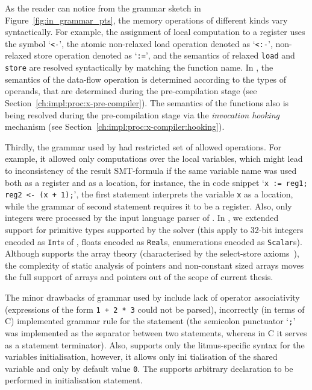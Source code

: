 As the reader can notice from the grammar sketch in Figure~\ref{fig:in_grammar_pts}, the memory operations of different kinds vary syntactically.
For example, the assignment of local computation to a register uses the symbol `\lstinline{<-}', the atomic non-relaxed load operation denoted as `\lstinline{<:-}', non-relaxed store operation denoted as `\lstinline{:=}', and the semantics of relaxed \lstinline{load} and \lstinline{store} are resolved syntactically by matching the function name.
In \porthos[2], the semantics of the data-flow operation is determined according to the types of operands, that are determined during the pre-compilation stage (see Section~\ref{ch:impl:proc:x-pre-compiler}).
The semantics of the functions also is being resolved during the pre-compilation stage via the \textit{invocation hooking} mechanism (see Section~\ref{ch:impl:proc:x-compiler:hooking}).

Thirdly, the grammar used by \porthos{} had restricted set of allowed operations. For example, it allowed only computations over the local variables, which might lead to inconsistency of the result SMT-formula if the same variable name was used both as a register and as a location, for instance, the in code snippet `\lstinline{x := reg1; reg2 <- (x + 1);}', the first statement interprets the variable \lstinline{x} as a location, while the grammar of second statement requires it to be a register. Also, only integers were processed by the input language parser of \porthos{}. In \porthos[2], we extended support for primitive types supported by the  solver (this apply to 32-bit integers encoded as \texttt{Int}s of , floats encoded as \texttt{Real}s, enumerations encoded as \texttt{Scalar}s).
Although  supports the array theory (characterised by the select-store axioms~\cite{de2011z3}), the complexity of static analysis of pointers and non-constant sized arrays moves the full support of arrays and pointers out of the scope of current thesis.

The minor drawbacks of grammar used by \porthos{} include lack of operator associativity (expressions of the form \lstinline{1 + 2 * 3} could not be parsed), incorrectly (in terms of C) implemented grammar rule for the statement (the semicolon punctuator `\lstinline{;}' was implemented as the separator between two statements, whereas in C it serves as a statement terminator). Also, \porthos{} supports only the litmus-specific syntax for the variables initialisation, however, it allows only ini
tialisation of the shared variable and only by default value \lstinline{0}. The \porthos[2] supports arbitrary declaration to be performed in initialisation statement.


